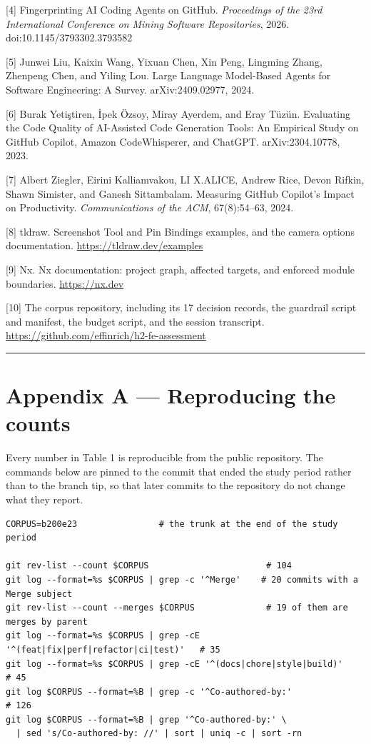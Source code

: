 \documentclass[11pt,a4paper]{article}
\begin{document}
[4] \textquotedbl{}Fingerprinting AI Coding Agents on GitHub.\textquotedbl{} \emph{Proceedings of the 23rd International Conference on Mining Software Repositories}, 2026. doi:10.1145/3793302.3793582

[5] Junwei Liu, Kaixin Wang, Yixuan Chen, Xin Peng, Lingming Zhang, Zhenpeng Chen, and Yiling Lou. \textquotedbl{}Large Language Model-Based Agents for Software Engineering: A Survey.\textquotedbl{} arXiv:2409.02977, 2024.

[6] Burak Yeti\c{s}tiren, \.{I}pek Özsoy, Miray Ayerdem, and Eray Tüzün. \textquotedbl{}Evaluating the Code Quality of AI-Assisted Code Generation Tools: An Empirical Study on GitHub Copilot, Amazon CodeWhisperer, and ChatGPT.\textquotedbl{} arXiv:2304.10778, 2023.

[7] Albert Ziegler, Eirini Kalliamvakou, LI X.ALICE, Andrew Rice, Devon Rifkin, Shawn Simister, and Ganesh Sittambalam. \textquotedbl{}Measuring GitHub Copilot's Impact on Productivity.\textquotedbl{} \emph{Communications of the ACM}, 67(8):54--63, 2024.

[8] tldraw. \textquotedbl{}Screenshot Tool\textquotedbl{} and \textquotedbl{}Pin Bindings\textquotedbl{} examples, and the camera options documentation. \url{https://tldraw.dev/examples}

[9] Nx. Nx documentation: project graph, affected targets, and enforced module boundaries. \url{https://nx.dev}

[10] The corpus repository, including its 17 decision records, the guardrail script and manifest, the budget script, and the session transcript. \url{https://github.com/effinrich/h2-fe-assessment}

\medskip\hrule\medskip

\section*{Appendix A --- Reproducing the counts}

Every number in Table 1 is reproducible from the public repository. The commands below are pinned to the commit that ended the study period rather than to the branch tip, so that later commits to the repository do not change what they report.

\begin{Verbatim}[fontsize=\footnotesize,breaklines=true,breakanywhere=true]
CORPUS=b200e23                # the trunk at the end of the study period

git rev-list --count $CORPUS                       # 104
git log --format=%s $CORPUS | grep -c '^Merge'    # 20 commits with a Merge subject
git rev-list --count --merges $CORPUS              # 19 of them are merges by parent
git log --format=%s $CORPUS | grep -cE '^(feat|fix|perf|refactor|ci|test)'   # 35
git log --format=%s $CORPUS | grep -cE '^(docs|chore|style|build)'            # 45
git log $CORPUS --format=%B | grep -c '^Co-authored-by:'                     # 126
git log $CORPUS --format=%B | grep '^Co-authored-by:' \
  | sed 's/Co-authored-by: //' | sort | uniq -c | sort -rn
\end{Verbatim}
\end{document}
